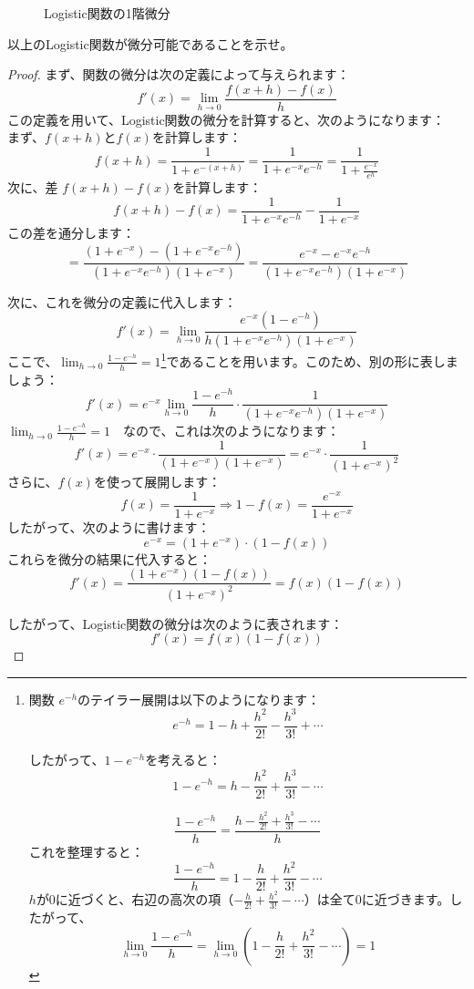\documentclass[a4paper]{jsarticle}%
\begin{document}
\begin{dfn}[シグモイド関数]
\begin{figure}[h]
\begin{minipage}{0.43\columnwidth}
    \caption{Logistic関数の1階微分}
    \label{fig:p2}
  \end{minipage}
\end{figure}
\begin{exercise}
  以上のLogistic関数が微分可能であることを示せ。
\end{exercise}

\begin{proof}
まず、関数の微分は次の定義によって与えられます：
\[
f'(x) = \lim_{h \to 0} \frac{f(x + h) - f(x)}{h}
\]
この定義を用いて、Logistic関数の微分を計算すると、次のようになります：\\
まず、\(f(x + h)\)と\(f(x)\)を計算します：
\[
f(x + h) = \frac{1}{1 + e^{-(x + h)}} = \frac{1}{1 + e^{-x} e^{-h}} = \frac{1}{1 + \frac{e^{-x}}{e^{h}}}
\]
次に、差 \(f(x + h) - f(x)\)を計算します：
\[
f(x + h) - f(x) = \frac{1}{1 + e^{-x} e^{-h}} - \frac{1}{1 + e^{-x}}
\]
この差を通分します：
\[
= \frac{(1 + e^{-x}) - (1 + e^{-x} e^{-h})}{(1 + e^{-x} e^{-h})(1 + e^{-x})}
= \frac{e^{-x} - e^{-x} e^{-h}}{(1 + e^{-x} e^{-h})(1 + e^{-x})}
\]

次に、これを微分の定義に代入します：
\[
f'(x) = \lim_{h \to 0} \frac{e^{-x}(1 - e^{-h})}{h(1 + e^{-x} e^{-h})(1 + e^{-x})}
\]
ここで、\(\lim_{h \to 0} \frac{1 - e^{-h}}{h} = 1\)\footnote{関数 \(e^{-h}\)のテイラー展開は以下のようになります：
\[
e^{-h} = 1 - h + \frac{h^2}{2!} - \frac{h^3}{3!} + \cdots
\]

したがって、\(1 - e^{-h}\)を考えると：
\[
1 - e^{-h} = h - \frac{h^2}{2!} + \frac{h^3}{3!} - \cdots
\]

\[
\frac{1 - e^{-h}}{h} = \frac{h - \frac{h^2}{2!} + \frac{h^3}{3!} - \cdots}{h}
\]
これを整理すると：
\[
  \frac{1 - e^{-h}}{h}= 1 - \frac{h}{2!} + \frac{h^2}{3!} - \cdots
\]
\(h\)が0に近づくと、右辺の高次の項（\(-\frac{h}{2!} + \frac{h^2}{3!} - \cdots\)）は全て0に近づきます。したがって、
\[
\lim_{h \to 0} \frac{1 - e^{-h}}{h} =\lim_{h \to 0} \left(1 - \frac{h}{2!} + \frac{h^2}{3!} - \cdots\right) = 1
\]
}であることを用います。このため、別の形に表しましょう：
\[
f'(x) = e^{-x} \lim_{h \to 0} \frac{1 - e^{-h}}{h} \cdot \frac{1}{(1 + e^{-x} e^{-h})(1 + e^{-x})}
\]
$\lim_{h \to 0} \frac{1 - e^{-h}}{h} = 1 \quad \text{なので、これは次のようになります：}$
\[
f'(x) = e^{-x} \cdot \frac{1}{(1 + e^{-x})(1 + e^{-x})} = e^{-x} \cdot \frac{1}{(1 + e^{-x})^2}
\]
さらに、\(f(x)\)を使って展開します：
\[
f(x) = \frac{1}{1 + e^{-x}} \Rightarrow 1 - f(x) = \frac{e^{-x}}{1 + e^{-x}}
\]
したがって、次のように書けます：
\[
e^{-x} = (1 + e^{-x}) \cdot (1 - f(x))
\]
これらを微分の結果に代入すると：
\[
f'(x) = \frac{(1 + e^{-x})(1 - f(x))}{(1 + e^{-x})^2} = f(x)(1 - f(x))
\]

したがって、Logistic関数の微分は次のように表されます：
\[
f'(x) = f(x)(1 - f(x))
\]


\end{proof}
\end{dfn}
\end{document}
